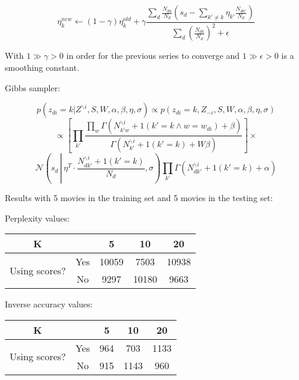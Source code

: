 \documentclass[a4paper,10pt]{report}
\begin{document}
$$ \eta_k^{new} \leftarrow (1 - \gamma) \eta_k^{old} + \gamma \frac{\sum_d \frac{N_{dk}}{N_d} \left( s_d - \sum_{k' \ne k} \eta_{k'} \frac{N_{dk'}}{N_d} \right)}{\sum_d \left( \frac{N_{dk}}{N_d}  \right)^2 + \epsilon}$$

With $1 \gg \gamma > 0$ in order for the previous series to converge and $1 \gg \epsilon > 0$ is a smoothing constant.

Gibbs sampler:

$$ p(z_{di} = k | Z^{\backslash i}, S, W, \alpha, \beta, \eta, \sigma) \propto p(z_{di} = k, Z_{-i}, S, W, \alpha, \beta, \eta, \sigma) $$
$$ \propto \left[ \prod_{k'} \frac{\prod_w \Gamma(N_{{k'}w}^{\backslash i} + 1(k' = k \wedge w = w_{di}) + \beta)}{\Gamma(N_{k'}^{\backslash i} + 1(k' = k) + W \beta)} \right] \times $$
$$ \mathcal{N}\left(s_d\, \left|\, \eta^T \cdot \frac{N_{d{k'}}^{\backslash i} + 1(k' = k)}{N_d}, \sigma\right. \right) \prod_{k'} \Gamma(N_{d{k'}}^{\backslash i} + 1(k' = k) + \alpha) $$

Results with 5 movies in the training set and 5 movies in the testing set:

Perplexity values:

\begin{center}
	\begin{tabular}{cc|ccc}
	K &  & 5 & 10 & 20 \\ \hline
	\multirow{2}{*}{Using scores?} & Yes & 10059 & 7503 & 10938   \\
	& No  & 9297 & 10180 & 9663   \\
	\end{tabular}
\end{center}

Inverse accuracy values:

\begin{center}
	\begin{tabular}{cc|ccc}
	K &  & 5 & 10 & 20 \\ \hline
	\multirow{2}{*}{Using scores?} & Yes & 964 & 703 & 1133   \\
	& No  & 915 & 1143 & 960   \\
	\end{tabular}
\end{center}
\end{document}
